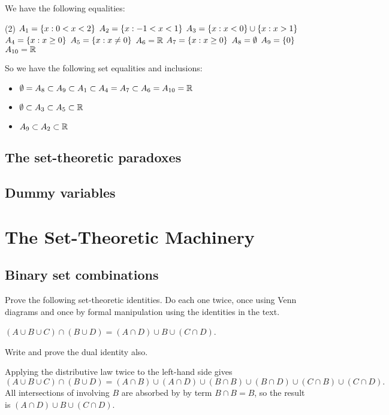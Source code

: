 \documentclass{report}
\begin{document}
\begin{solution}
We have the following equalities:
\begin{tasks}[label=](2)
    \task $A_1=\left\{ x : 0 < x <2 \right\}$
    \task $A_2=\left\{ x : -1 < x < 1 \right\}$
    \task $A_3=\left\{ x : x < 0 \right\}\cup \left\{ x : x > 1 \right\}$
    \task $A_4=\left\{ x : x\geq 0 \right\}$
    \task $A_5=\left\{ x : x\neq 0 \right\}$
    \task $A_6=\mathbb{R}$
    \task $A_7=\left\{ x : x\geq 0 \right\}$
    \task $A_8=\emptyset$
    \task $A_9=\left\{0\right\}$
    \task $A_{10}=\mathbb{R}$
\end{tasks}

So we have the following set equalities and inclusions:
\begin{itemize}
    \item $\emptyset = A_8 \subset A_9 \subset A_1 \subset A_4 = A_7 \subset A_6 = A_{10} = \mathbb{R}$
    \item $\emptyset \subset A_3 \subset A_5 \subset \mathbb{R}$
    \item $A_9 \subset A_2 \subset \mathbb{R}$
\end{itemize}
\end{solution}




\section{The set-theoretic paradoxes}
\section{Dummy variables}



\chapter{The Set-Theoretic Machinery}
\section{Binary set combinations}
Prove the following set-theoretic identities. Do each one twice, once using Venn
diagrams and once by formal manipulation using the identities in the text.

\begin{exercise}
$(A\cup B\cup C)\cap(B\cup D) = (A\cap D)\cup B\cup (C\cap D)$.

Write and prove the dual identity also.
\end{exercise}

\begin{solution}
Applying the distributive law twice to the left-hand side gives
\[
    (A\cup B\cup C)\cap(B\cup D)
    = (A\cap B)\cup (A\cap D)\cup (B\cap B)\cup (B\cap D)\cup (C\cap B)\cup (C\cap D).
\]
All intersections of involving $B$ are absorbed by by term $B\cap B=B$, so the result is
$(A\cap D)\cup B \cup (C\cap D)$.
\end{solution}
\end{document}
